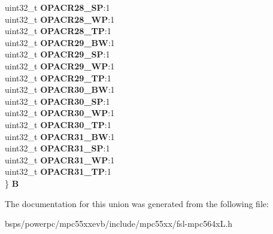 \begin{DoxyCompactItemize}
\begin{tabbing}
\>uint32\_t {\bfseries OPACR28\_SP}:1\\
\>uint32\_t {\bfseries OPACR28\_WP}:1\\
\>uint32\_t {\bfseries OPACR28\_TP}:1\\
\>uint32\_t {\bfseries OPACR29\_BW}:1\\
\>uint32\_t {\bfseries OPACR29\_SP}:1\\
\>uint32\_t {\bfseries OPACR29\_WP}:1\\
\>uint32\_t {\bfseries OPACR29\_TP}:1\\
\>uint32\_t {\bfseries OPACR30\_BW}:1\\
\>uint32\_t {\bfseries OPACR30\_SP}:1\\
\>uint32\_t {\bfseries OPACR30\_WP}:1\\
\>uint32\_t {\bfseries OPACR30\_TP}:1\\
\>uint32\_t {\bfseries OPACR31\_BW}:1\\
\>uint32\_t {\bfseries OPACR31\_SP}:1\\
\>uint32\_t {\bfseries OPACR31\_WP}:1\\
\>uint32\_t {\bfseries OPACR31\_TP}:1\\
\} {\bfseries B}\\

\end{tabbing}\end{DoxyCompactItemize}


The documentation for this union was generated from the following file\+:\begin{DoxyCompactItemize}
\item 
bsps/powerpc/mpc55xxevb/include/mpc55xx/fsl-\/mpc564x\+L.\+h\end{DoxyCompactItemize}
